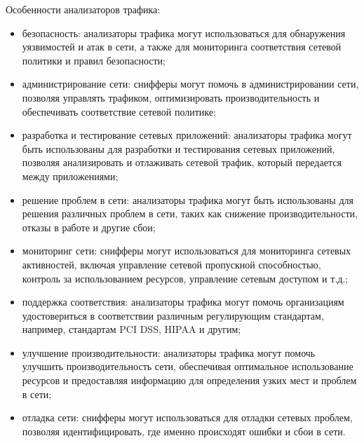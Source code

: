 Особенности анализаторов трафика:
\begin{itemize}
    \item безопасность: анализаторы трафика могут использоваться для
    обнаружения уязвимостей и атак в сети, а также для мониторинга соответствия
    сетевой политики и правил безопасности;
    \item администрирование сети: снифферы могут помочь в администрировании
    сети, позволяя управлять трафиком, оптимизировать производительность и
    обеспечивать соответствие сетевой политике;
    \item разработка и тестирование сетевых приложений: анализаторы трафика
    могут быть использованы для разработки и тестирования сетевых приложений,
    позволяя анализировать и отлаживать сетевой трафик, который передается
    между приложениями;
    \item решение проблем в сети: анализаторы трафика могут быть использованы
    для решения различных проблем в сети, таких как снижение
    производительности, отказы в работе и другие сбои;
    \item мониторинг сети: снифферы могут использоваться для мониторинга
    сетевых активностей, включая управление сетевой пропускной способностью,
    контроль за использованием ресурсов, управление сетевым доступом и т.д.;
    \item поддержка соответствия: анализаторы трафика могут помочь
    организациям удостовериться в соответствии различным регулирующим
    стандартам, например, стандартам PCI DSS, HIPAA и другим;
    \item улучшение производительности: анализаторы трафика могут помочь
    улучшить производительность сети, обеспечивая оптимальное использование
    ресурсов и предоставляя информацию для определения узких мест и проблем в
    сети;
    \item отладка сети: снифферы могут использоваться для отладки сетевых
    проблем, позволяя идентифицировать, где именно происходят ошибки и сбои в
    сети.
\end{itemize}



